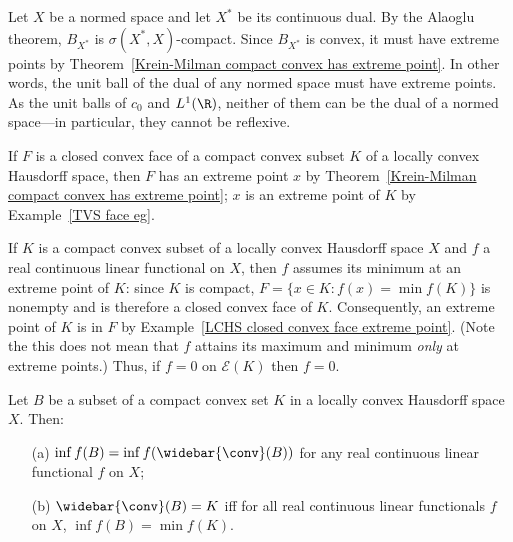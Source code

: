 \begin{example}\label{NVS dual has extreme point}
Let $X$ be a normed space and let $X^*$ be its continuous dual. By the Alaoglu theorem, $B_{X^*}$ is $\sigma(X^*,X)$-compact. Since $B_{X^*}$ is convex, it must have extreme points by Theorem~\ref{Krein-Milman compact convex has extreme point}. In other words, the unit ball of the dual of any normed space must have extreme points. As the unit balls of $c_0$ and $L^1(\R)$, neither of them can be the dual of a normed space---in particular, they cannot be reflexive.
\end{example}
\begin{example}\label{LCHS closed convex face extreme point}
If $F$ is a closed convex face of a compact convex subset $K$ of a locally convex Hausdorff space, then $F$ has an extreme point $x$ by Theorem~\ref{Krein-Milman compact convex has extreme point}; $x$ is an extreme point of $K$ by Example~\ref{TVS face eg}.
\end{example}
\begin{example}\label{LCHS real functional minimal on extreme point}
If $K$ is a compact convex subset of a locally convex Hausdorff space $X$ and $f$ a real continuous linear functional on $X$, then $f$ assumes its minimum at an extreme point of $K$: since $K$ is compact, $F=\{x\in K:f(x)=\min f(K)\}$ is nonempty and is therefore a closed convex face of $K$. Consequently, an extreme point of $K$ is in $F$ by Example~\ref{LCHS closed convex face extreme point}. (Note the this does not mean that $f$ attains its maximum and minimum \textit{only} at extreme points.) Thus, if $f=0$ on $\mathcal{E}(K)$ then $f=0$.
\end{example}
\begin{theorem}\label{Krein-Milman closed convex hull equal iff linear functional}
Let $B$ be a subset of a compact convex set $K$ in a locally convex Hausdorff space $X$. Then:
\begin{itemize}
\item[(a)] $\inf f(B)=\inf f(\widebar{\conv}(B))$ for any real continuous linear functional $f$ on $X$;
\item[(b)] $\widebar{\conv}(B)=K$ iff for all real continuous linear functionals $f$ on $X$, $\inf f(B)=\min f(K)$.  
\end{itemize}
\end{theorem}
